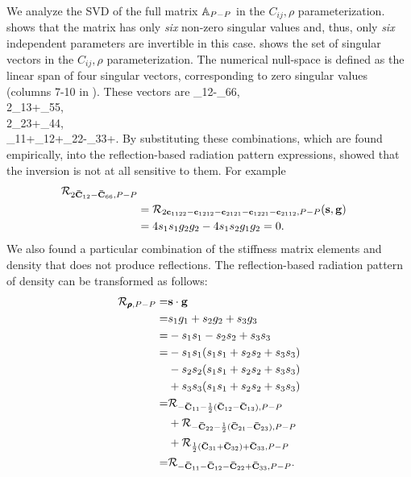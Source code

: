 We analyze the SVD of the full matrix $\mathbb{A}_{P-P}$ in the 
$C_{ij},\rho$ parameterization.  shows that the 
matrix has only \emph{six} non-zero singular values and, thus, only \emph{six} 
independent parameters are invertible in this case. 
 shows the set of singular vectors in the 
$C_{ij},\rho$ parameterization. The numerical null-space is defined as the linear span of 
four singular vectors, corresponding to zero singular values (columns 7-10 in 
). 
These vectors are
\nmz{\Cv}_{12}-\nmz{\Cv}_{66}, \label{eq:C12C66}
\\
2\nmz{\Cv}_{13}+\nmz{\Cv}_{55},
\\
2\nmz{\Cv}_{23}+\nmz{\Cv}_{44},
\\
\nmz{\Cv}_{11}+\nmz{\Cv}_{12}+\nmz{\Cv}_{22}-\nmz{\Cv}_{33}+\nmz{\rhov}. 
\eeq
By substituting these combinations, which are found empirically, into the 
reflection-based radiation pattern expressions, \cite{kazei2018} showed that the inversion is not at all sensitive to them. 
For example
\begin{align}
\mathcal{R}_{2\mathbf{\bar{\text{$\mathbf{C}$}}}_{12}-\mathbf{\bar{\text{$\mathbf{C}$}}}_{66},P-P} \\ \nonumber
&= \mathcal{R}_{2\mathbf{c}_{1122}-\mathbf{c}_{1212}-\mathbf{c}_{2121}-\mathbf{c}_{1221}-\mathbf{c}_{2112},P-P}(\mathbf{s},\mathbf{g}) \\ \nonumber
&= 4 s_1s_1g_2g_2 - 4 s_1s_2g_1g_2 = 0.
\end{align}
%
We also found \citep{kazei2018} a particular combination of the stiffness matrix elements and density that does not produce reflections. The reflection-based radiation pattern of density can be transformed as follows:
\begin{align}
\mathcal{R}_{\pmb{\rho},P-P} =& \mathbf{s}\cdot\mathbf{g} \\ \nonumber
=& s_1g_1 + s_2g_2 + s_3g_3 \\ \nonumber
=& -s_1s_1-s_2s_2+s_3s_3 \\ \nonumber
=& -s_1s_1(s_1s_1+s_2s_2+s_3s_3) \\ \nonumber
&- s_2s_2(s_1s_1+s_2s_2+s_3s_3) \\ \nonumber
&+ s_3s_3(s_1s_1+s_2s_2+s_3s_3) \\ \nonumber
=& \mathcal{R}_{-\mathbf{\bar{\text{$\mathbf{C}$}}}_{11}-\frac{1}{2}(\mathbf{\bar{\text{$\mathbf{C}$}}}_{12}-\mathbf{\bar{\text{$\mathbf{C}$}}}_{13}),P-P} \\ \nonumber
&+ \mathcal{R}_{-\mathbf{\bar{\text{$\mathbf{C}$}}}_{22}-\frac{1}{2}(\mathbf{\bar{\text{$\mathbf{C}$}}}_{21}-\mathbf{\bar{\text{$\mathbf{C}$}}}_{23}),P-P} \\ \nonumber
&+ \mathcal{R}_{\frac{1}{2}(\mathbf{\bar{\text{$\mathbf{C}$}}}_{31}+\mathbf{\bar{\text{$\mathbf{C}$}}}_{32})+\mathbf{\bar{\text{$\mathbf{C}$}}}_{33},P-P} \\ \nonumber
=& \mathcal{R}_{-\mathbf{\bar{\text{$\mathbf{C}$}}}_{11}-\mathbf{\bar{\text{$\mathbf{C}$}}}_{12}-\mathbf{\bar{\text{$\mathbf{C}$}}}_{22}+\mathbf{\bar{\text{$\mathbf{C}$}}}_{33},P-P}.
\end{align}
